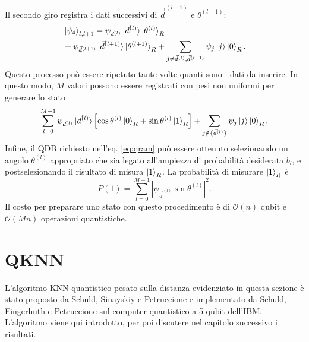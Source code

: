 Il secondo giro registra i dati successivi di $\vec{d}^{(l+1)}$ e $\theta^{(l+1)}$: 
\begin{equation}
    \begin{split}
        &\ket{\psi_4}_{l,l+1} = \psi_{\vec{d}^{(l)}} \ket{\vec{d}^{(l)}} \ket{\theta^{(l)}}_R + \\
        &+ \psi_{\vec{d}^{(l+1)}} \ket{\vec{d}^{(l+1)}} \ket{\theta^{(l+1)}}_R + 
        \sum_{j \neq \vec{d}^{(l)},\vec{d}^{(l+1)}} \psi_j \ket{j} \ket{0}_R.
    \end{split}
\end{equation}
Questo processo può essere ripetuto tante volte quanti sono i dati da inserire. 
In questo modo, $M$ valori possono essere registrati con pesi non uniformi per 
generare lo stato 
\begin{equation}
    \sum_{l=0}^{M-1} \psi_{\vec{d}^{(l)}} \ket{\vec{d}^{(l)}} \left[ \cos\theta^{(l)} 
    \ket{0}_R + \sin\theta^{(l)} \ket{1}_R \right] + 
    \sum_{j \notin \{ \vec{d}^{(l)} \}} \psi_j \ket{j} \ket{0}_R.
\end{equation}
Infine, il \ac{QDB} richiesto nell'eq. \ref{eq:qram} può essere ottenuto 
selezionando un angolo $\theta^{(l)}$ appropriato che sia legato all'ampiezza di 
probabilità desiderata $b_l$, e postselezionando il risultato di misura $\ket{1}_R$. 
La probabilità di misurare $\ket{1}_R$ è 
\begin{equation} \label{eq:qram.prob}
    P(1) = \sum_{l=0}^{M-1} |\psi_{\vec{d}^{(l)}} \sin\theta^{(l)} |^2.
\end{equation}
Il costo per preparare uno stato con questo procedimento è di 
$\mathcal{O}(n)$ qubit e $\mathcal{O}(Mn)$ operazioni quantistiche. 

\section{QKNN}

L'algoritmo \ac{KNN} quantistico pesato sulla distanza evidenziato in questa sezione è stato 
proposto da Schuld, Sinayskiy e Petruccione \cite{10.1007/978-3-319-13560-1_17} 
e implementato da Schuld, Fingerhuth e Petruccione \citep{schuld} sul computer 
quantistico a 5 qubit dell'IBM. 
L'algoritmo viene qui introdotto, per poi discutere nel capitolo 
successivo i risultati. 


